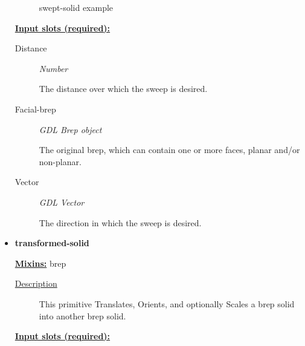 \documentclass [11pt]{book}
\begin{document}
\begin{itemize}
\begin{figure}
\caption{swept-solid example}

\label{fig:swept-solid}

\end{figure}





\textbf{
\underline{Input slots (required):}}

\begin{description}

\item [Distance]
\emph{Number}

 The distance over which the sweep is desired.




\item [Facial-brep]
\emph{GDL Brep object}

 The original brep, which can contain one or more faces, planar and/or non-planar.




\item [Vector]
\emph{GDL Vector}

 The direction in which the sweep is desired.




\end{description}







\item {}
\label{prim:transformed-solid}
\textbf{transformed-solid}


\textbf{
\underline{Mixins:}} brep





\begin{description}

\item [
\underline{Description}]


This primitive Translates, Orients, and optionally Scales a brep solid into another brep solid.



\end{description}








\textbf{
\underline{Input slots (required):}}


\end{itemize}
\end{document}
